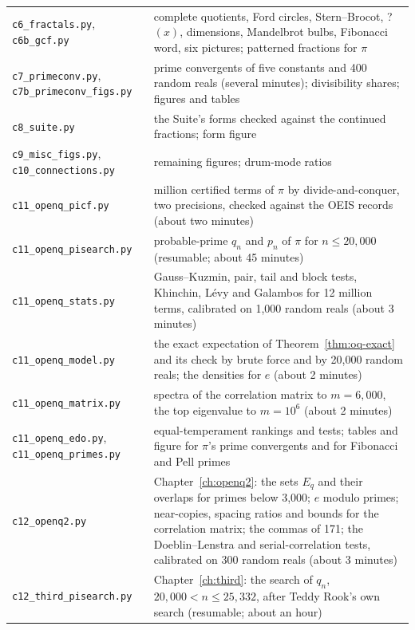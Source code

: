 {\begin{longtable}{@{}>{\raggedright\arraybackslash}p{}>{\raggedright\arraybackslash}p{}@{}}
\texttt{c6\_fractals.py}, \texttt{c6b\_gcf.py} & complete quotients, Ford circles, Stern--Brocot, ?$(x)$, dimensions, Mandelbrot bulbs, Fibonacci word, six pictures; patterned fractions for $\pi$ \\
\texttt{c7\_primeconv.py}, \texttt{c7b\_primeconv\_figs.py} & prime convergents of five constants and 400 random reals (several minutes); divisibility shares; figures and tables \\
\texttt{c8\_suite.py} & the Suite's forms checked against the continued fractions; form figure \\
\texttt{c9\_misc\_figs.py}, \texttt{c10\_connections.py} & remaining figures; drum-mode ratios \\
\texttt{c11\_openq\_picf.py} \addedon{\revA} & 12 million certified terms of $\pi$ by divide-and-conquer, two precisions, checked against the OEIS records (about two minutes) \\
\texttt{c11\_openq\_pisearch.py} \addedon{\revA} & probable-prime $q_n$ and $p_n$ of $\pi$ for $n \le 20{,}000$ (resumable; about 45 minutes) \\
\texttt{c11\_openq\_stats.py} \addedon{\revA} & Gauss--Kuzmin, pair, tail and block tests, Khinchin, Lévy and Galambos for 12 million terms, calibrated on 1{,}000 random reals (about 3 minutes) \\
\texttt{c11\_openq\_model.py} \addedon{\revA} & the exact expectation of Theorem~\ref{thm:oq-exact} and its check by brute force and by 20{,}000 random reals; the densities for $e$ (about 2 minutes) \\
\texttt{c11\_openq\_matrix.py} \addedon{\revA} & spectra of the correlation matrix to $m = 6{,}000$, the top eigenvalue to $m = 10^6$ (about 2 minutes) \\
\texttt{c11\_openq\_edo.py}, \texttt{c11\_openq\_primes.py} \addedon{\revA} & equal-temperament rankings and tests; tables and figure for $\pi$'s prime convergents and for Fibonacci and Pell primes \\
\texttt{c12\_openq2.py} \addedon{\revB} & Chapter~\ref{ch:openq2}: the sets $E_q$ and their overlaps for primes below 3{,}000; $e$ modulo primes; near-copies, spacing ratios and bounds for the correlation matrix; the commas of 171; the Doeblin--Lenstra and serial-correlation tests, calibrated on 300 random reals (about 3 minutes) \\
\texttt{c12\_third\_pisearch.py} \addedon{\revC} & Chapter~\ref{ch:third}: the search of $q_n$, $20{,}000 < n \le 25{,}332$, after Teddy Rook's own search (resumable; about an hour) \\

\end{longtable}}
